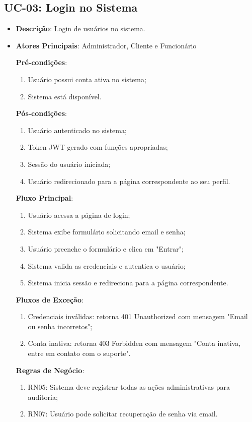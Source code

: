 \subsection{UC-03: Login no Sistema}

\begin{itemize}[topsep=1pt, itemsep=0pt]
  \item[]\textbf{Descrição}: Login de usuários no sistema.

  \item[]\textbf{Atores Principais}: Administrador, Cliente e Funcionário

  \textbf{Pré-condições}:
  \begin{enumerate}
    \item Usuário possui conta ativa no sistema;
    \item Sistema está disponível.
  \end{enumerate}

  \textbf{Pós-condições}:
  \begin{enumerate}
    \item Usuário autenticado no sistema;
    \item Token JWT gerado com funções apropriadas;
    \item Sessão do usuário iniciada;
    \item Usuário redirecionado para a página correspondente ao seu perfil.
  \end{enumerate}

  \textbf{Fluxo Principal}:
  \begin{enumerate}
    \item Usuário acessa a página de login;
    \item Sistema exibe formulário solicitando email e senha;
    \item Usuário preenche o formulário e clica em "Entrar";
    \item Sistema valida as credenciais e autentica o usuário;
    \item Sistema inicia sessão e redireciona para a página correspondente.
  \end{enumerate}

  \textbf{Fluxos de Exceção}:
  \begin{enumerate}
    \item Credenciais inválidas: retorna 401 Unauthorized com mensagem "Email ou senha incorretos";
    \item Conta inativa: retorna 403 Forbidden com mensagem "Conta inativa, entre em contato com o suporte".
  \end{enumerate}

  \textbf{Regras de Negócio}:
  \begin{enumerate}
    \item RN05: Sistema deve registrar todas as ações administrativas para auditoria;
    \item RN07: Usuário pode solicitar recuperação de senha via email.
  \end{enumerate}
\end{itemize}
